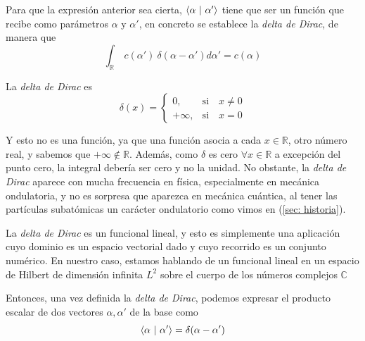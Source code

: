 \documentclass[12pt]{article}
\numberwithin{equation}{section} %
\begin{document}
    \vspace{2.5mm}

    Para que la expresión anterior sea cierta, \( \braket{\alpha \ | \ \alpha'} \) tiene que ser un función que recibe como parámetros \( \alpha \) y \( \alpha' \), en concreto se establece la \textit{delta de Dirac}, de manera que
    \begin{equation*}
        \int_{\mathbb{R}} \ c (\alpha') \ \delta(\alpha - \alpha') d \alpha' = c (\alpha)
    \end{equation*}

    \vspace{2.5mm}

    La \textit{delta de Dirac} es
    \begin{equation}
        \delta(x) =
        \begin{cases}
            0, & \text{si} \quad x \neq 0 \\
            +\infty, & \text{si} \quad x = 0
        \end{cases}
    \end{equation}

    \vspace{2.5mm}

    Y esto no es una función, ya que una función asocia a cada \( x \in \mathbb{R} \), otro número real, y sabemos que \( +\infty \notin \mathbb{R} \). Además, como \( \delta \) es cero \( \forall x \in \mathbb{R} \) a excepción del punto cero, la integral debería ser cero y no la unidad. No obstante, la \textit{delta de Dirac} aparece con mucha frecuencia en física, especialmente en mecánica ondulatoria, y no es sorpresa que aparezca en mecánica cuántica, al tener las partículas subatómicas un carácter ondulatorio como vimos en (\ref{sec: historia}).

    \vspace{5mm}

    La \textit{delta de Dirac} es un funcional lineal, y esto es simplemente una aplicación cuyo dominio es un espacio vectorial dado y cuyo recorrido es un conjunto numérico. En nuestro caso, estamos hablando de un funcional lineal en un espacio de Hilbert de dimensión infinita \( L^{2} \) sobre el cuerpo de los números complejos \( \mathbb{C} \)

    \vspace{5mm}

    Entonces, una vez definida la \textit{delta de Dirac}, podemos expresar el producto escalar de dos vectores \( \alpha, \alpha' \) de la base como
    \begin{equation}
        \braket{\alpha \ | \ \alpha'} = \delta(\alpha - \alpha')
    \end{equation}
\end{document}
